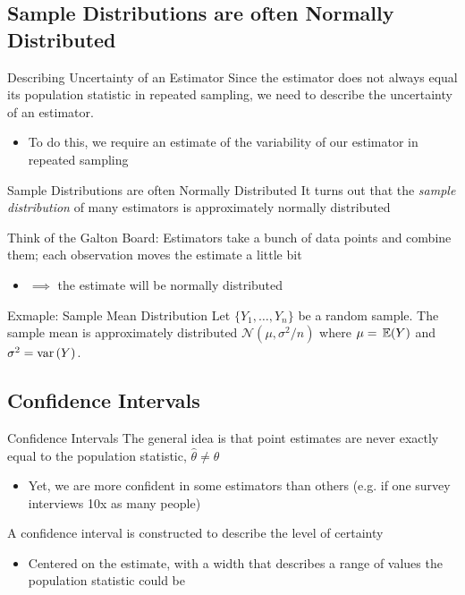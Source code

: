 \documentclass[aspectratio=169,t,11pt,table]{beamer}
\begin{document}
\subsection*{Sample Distributions are often Normally Distributed}

\begin{frame}{Describing Uncertainty of an Estimator}
  Since the estimator does not always equal its population statistic in repeated sampling, we need to describe the uncertainty of an estimator.  
  \begin{itemize}
    \item To do this, we require an estimate of the variability of our estimator in repeated sampling
  \end{itemize}
\end{frame}

\begin{frame}{Sample Distributions are often Normally Distributed}
  It turns out that the \emph{sample distribution} of many estimators is approximately normally distributed
  
  \bigskip
  Think of the Galton Board: Estimators take a bunch of data points and combine them; each observation moves the estimate a little bit
  \begin{itemize}
    \item $\implies$ the estimate will be normally distributed
  \end{itemize}
\end{frame}

\begin{frame}{Exmaple: Sample Mean Distribution}
  Let $\{ Y_1, \dots, Y_n \}$ be a random sample. The sample mean is approximately distributed $\mathcal{N}(\mu, \sigma^2 / n)$ where $\mu = \expec{Y}$ and $\sigma^2 = \var{Y}$. 
\end{frame}

\subsection*{Confidence Intervals}

\begin{frame}{Confidence Intervals}
  The general idea is that point estimates are never exactly equal to the population statistic, $\hat{\theta} \neq \theta$
  \begin{itemize}
    \item Yet, we are more confident in some estimators than others (e.g. if one survey interviews 10x as many people)
  \end{itemize}

  \bigskip
  A \alert{confidence interval} is constructed to describe the level of certainty
  \begin{itemize}
    \item Centered on the estimate, with a width that describes a range of values the population statistic could be
  \end{itemize}
\end{frame}
\end{document}
